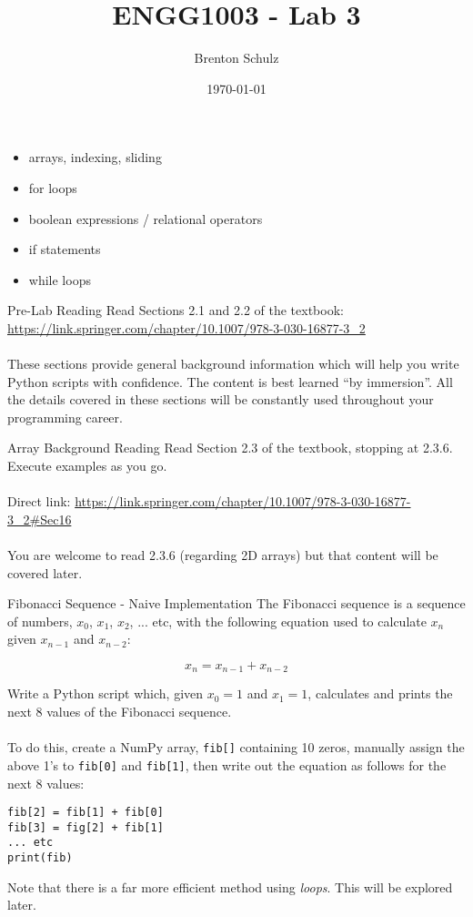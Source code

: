 \documentclass{lab}
\title{ENGG1003 - Lab 3}
\author{Brenton Schulz}
\date{\today}
\begin{document}
\maketitle

\begin{itemize}
\item arrays, indexing, sliding
\item for loops
\item boolean expressions / relational operators
\item if statements
\item while loops
\end{itemize}

\begin{task}{Pre-Lab Reading}{}
Read Sections 2.1 and 2.2 of the textbook: \url{https://link.springer.com/chapter/10.1007/978-3-030-16877-3_2}
\\~\\
These sections provide general background information which will help you write Python scripts with confidence. The content is best learned ``by immersion''. All the details covered in these sections will be constantly used throughout your programming career.
\end{task}

\begin{task}{Array Background Reading}{}
Read Section 2.3 of the textbook, stopping at 2.3.6. Execute examples as you go.
\\~\\
Direct link: \url{https://link.springer.com/chapter/10.1007/978-3-030-16877-3_2#Sec16}
\\~\\
You are welcome to read 2.3.6 (regarding 2D arrays) but that content will be covered later.
\end{task}

\begin{task}{Fibonacci  Sequence - Naive Implementation}{}
The Fibonacci sequence is a sequence of numbers, $x_0$, $x_1$, $x_2$, ... etc, with the following equation used to calculate $x_n$ given $x_{n-1}$ and $x_{n-2}$:

\begin{equation}\label{eq:fib}
x_n = x_{n-1} + x_{n-2}
\end{equation}

Write a Python script which, given $x_0=1$ and $x_1=1$, calculates and prints the next 8 values of the Fibonacci sequence.
\\~\\
To do this, create a NumPy array, \texttt{fib[]} containing 10 zeros, manually assign the above 1's to \texttt{fib[0]} and \texttt{fib[1]}, then write out the equation as follows for the next 8 values:
\begin{lstlisting}
fib[2] = fib[1] + fib[0]
fib[3] = fig[2] + fib[1]
... etc
print(fib)
\end{lstlisting}

Note that there is a far more efficient method using \textit{loops}. This will be explored later.
\end{task}
\end{document}
